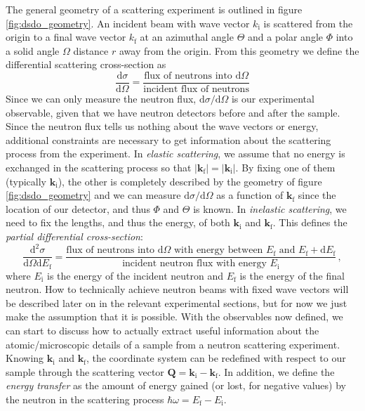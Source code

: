 The general geometry of a scattering experiment is outlined in figure \ref{fig:dsdo_geometry}. An incident beam with wave vector $k_\text{i}$ is scattered from the origin to a final wave vector $k_\text{f}$ at an azimuthal angle $\Theta$ and a polar angle $\Phi$ into a solid angle $\Omega$ distance $r$ away from the origin. From this geometry we define the differential scattering cross-section as
%
\[ \frac{\mathrm{d} \sigma}{\mathrm{d}\Omega} = \frac{\text{flux of neutrons into } \mathrm{d}\Omega}{\text{incident flux of neutrons}} \]
%
Since we can only measure the neutron flux, $\mathrm{d}\sigma / \mathrm{d}\Omega$ is our experimental observable, given that we have neutron detectors before and after the sample. Since the neutron flux tells us nothing about the wave vectors or energy, additional constraints are necessary to get information about the scattering process from the experiment. In \emph{elastic scattering}, we assume that no energy is exchanged in the scattering process so that $|\bm{k}_\text{f}| = |\bm{k}_\text{i}|$. By fixing one of them (typically $\bm{k}_\text{i}$), the other is completely described by the geometry of figure \ref{fig:dsdo_geometry} and we can measure $\mathrm{d}\sigma / \mathrm{d}\Omega$ as a function of $\bm{k}_\text{f}$ since the location of our detector, and thus $\Phi$ and $\Theta$ is known. In \emph{inelastic scattering}, we need to fix the lengths, and thus the energy, of both $\bm{k}_\text{i}$ and $\bm{k}_\text{f}$. This defines the \emph{partial differential cross-section}:
%
\[ \frac{\mathrm{d}^2 \sigma}{\mathrm{d}\Omega \mathrm{d}E_\text{f}} = \frac{\text{flux of neutrons into } \mathrm{d}\Omega \text{ with energy between } E_\text{f} \text{ and } E_\text{f} + \mathrm{d}E_\text{f}}{\text{incident neutron flux with energy } E_\text{i}} \, , \]
%
where $E_\text{i}$ is the energy of the incident neutron and $E_\text{f}$ is the energy of the final neutron. How to technically achieve neutron beams with fixed wave vectors will be described later on in the relevant experimental sections, but for now we just make the assumption that it is possible. With the observables now defined, we can start to discuss how to actually extract useful information about the atomic/microscopic details of a sample from a neutron scattering experiment. Knowing $\bm{k}_\text{i}$ and $\bm{k}_\text{f}$, the coordinate system can be redefined with respect to our sample through the scattering vector $\bm{Q} = \bm{k}_\text{i} - \bm{k}_\text{f}$. In addition, we define the \emph{energy transfer} as the amount of energy gained (or lost, for negative values) by the neutron in the scattering process $\hbar \omega = E_\text{f} - E_\text{i}$.

